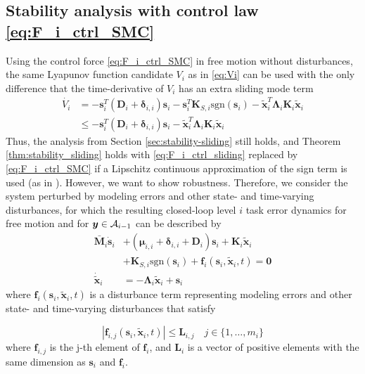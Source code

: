 \documentclass[../main.tex]{subfiles}
\begin{document}
\subsection{Stability analysis with control law \eqref{eq:F_i_ctrl_SMC}}
\label{sec:stability_SMC}
Using the control force \eqref{eq:F_i_ctrl_SMC} in free motion without disturbances, the same Lyapunov function candidate $V_i$ as in \eqref{eq:Vi} can be used with the only difference that the time-derivative of $V_i$ has an extra sliding mode term
\begin{align}
    \label{eq:V_i_dot_SMC}
    \dot{V_i} &= -\bm{s}_i^T (\bm{D}_i + \bm{\delta}_{i,i}) \bm{s}_i - \bm{s}_i^T \bm{K}_{S,i} \text{sgn}(\bm{s}_i)- \tilde{\bm{x}}_i ^T\bm{\Lambda}_{i} \bm{K}_i \tilde{\bm{x}}_i \nonumber\\
    & \leq -\bm{s}_i^T (\bm{D}_i + \bm{\delta}_{i,i}) \bm{s}_i
    - \tilde{\bm{x}}_i^T \bm{\Lambda}_i \bm{K}_i \tilde{\bm{x}}_i
\end{align}
Thus, the analysis from Section \ref{sec:stability-sliding} still holds, and Theorem \ref{thm:stability_sliding} holds with \eqref{eq:F_i_ctrl_sliding} replaced by \eqref{eq:F_i_ctrl_SMC} if a Lipschitz continuous approximation of the sign term is used (as in \cite[Chaper 14.2]{Khalil2002}). However, we want to show robustness. Therefore, we consider the system perturbed by modeling errors and other state- and time-varying disturbances, for which the resulting closed-loop level $i$ task error dynamics for free motion and for $\bm{y} \in {\cal{A}}_{i-1}$ can be described by
\begin{subequations}
    \label{eq:CL_SM_robust}
    \begin{align}
        \bar{\bm{M}}_i \dot{\bm{s}}_i
        &+ (\bm{\mu}_{i,i}+ \bm{\delta}_{i,i} + \bm{D}_i)\bm{s}_i
        + \bm{K}_i \tilde{\bm{x}}_i \\
        &+\bm{K}_{S,i} \text{sgn}(\bm{s}_i)
        + \bm{f}_i(\bm{s}_i,\tilde{\bm{x}}_i,t) = \bm{0} \nonumber \\
        \dot{\tilde{\bm{x}}}_i &= - \bm{\Lambda}_i \tilde{\bm{x}}_i + \bm{s}_i
    \end{align}
\end{subequations}
where $\bm{f}_i(\bm{s}_i,\tilde{\bm{x}}_i,t)$ is a disturbance term representing modeling errors and other state- and time-varying disturbances that satisfy
\begin{assumption}
    \label{ass:bounded_disturbance}
     \begin{equation*}
        |\bm{f}_{i, j}(\bm{s}_i,\tilde{\bm{x}}_i,t)|\leq \bm{L}_{i,j} \quad j \in \{1,\dots,m_i\}
    \end{equation*}
where $\bm{f}_{i, j}$ is the j-th element of $\bm{f}_{i}$, and $\bm{L}_i$ is a vector of positive elements with the same dimension as $\bm{s}_i$ and $\bm{f}_i$.
\end{assumption}
\end{document}
